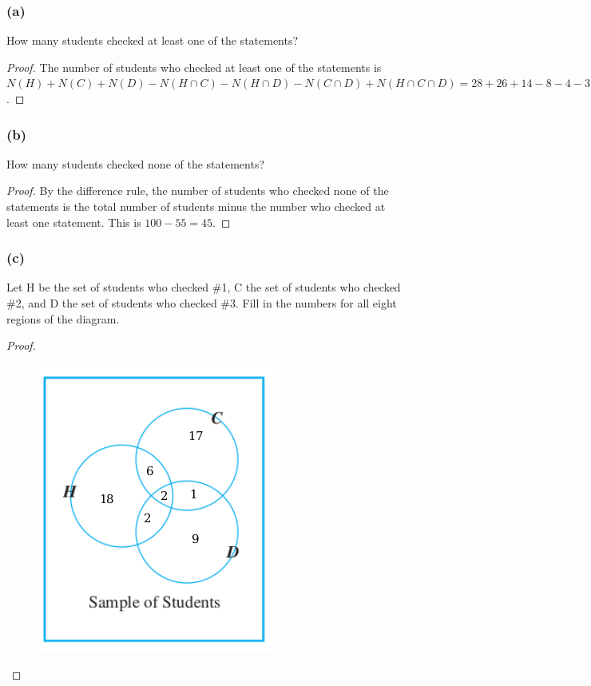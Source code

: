 \documentclass[14pt]{extarticle}
\begin{document}
\subsubsection{(a)}
How many students checked at least one of the statements?

\begin{proof}
     The number of students who checked at least one of the statements is \(N(H) + N(C) + N(D) - N(H \cap C) -
     N(H \cap D) - N(C \cap D) + N(H \cap C \cap D) = 28 + 26 + 14 - 8 - 4 - 3 + 2 = 55\).
\end{proof}

\subsubsection{(b)}
How many students checked none of the statements?

\begin{proof}
     By the difference rule, the number of students who checked none of the statements is the total number of students
     minus the number who checked at least one statement. This is \(100 - 55 = 45\).
\end{proof}

\subsubsection{(c)}
Let H be the set of students who checked \#1, C the set of students who checked \#2, and D the set of students who
checked \#3. Fill in the numbers for all eight regions of the diagram.

\begin{proof}
     \begin{figure}[ht!]
          \centering
          \includegraphics[scale=0.5]{../images/9.3.33.c.2.png}
     \end{figure}
\end{proof}
\end{document}
